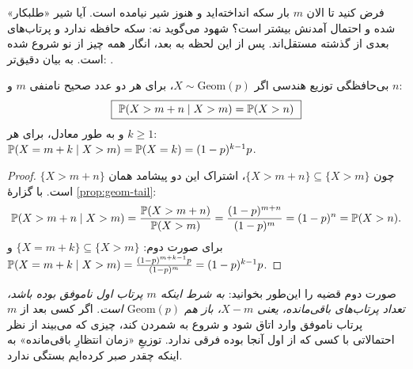 فرض کنید تا الان $m$ بار سکه انداخته‌اید و هنوز شیر نیامده است. آیا شیر «طلبکار» شده و احتمال آمدنش بیشتر است؟ شهود می‌گوید نه: سکه حافظه ندارد و پرتاب‌های بعدی از گذشته مستقل‌اند. پس از این لحظه به بعد، انگار همه چیز از نو شروع شده است. به بیان دقیق‌تر: .

\begin{theorem}[label=thm:memoryless]{بی‌حافظگی توزیع هندسی}
اگر $X\sim\mathrm{Geom}(p)$، برای هر دو عدد صحیح نامنفی $m$ و $n$:
\[ \boxed{\ \P(X>m+n\mid X>m)=\P(X>n)\ } \]
و به طور معادل، برای هر $k\ge1$: \ $\P(X=m+k\mid X>m)=\P(X=k)=(1-p)^{k-1}p$.
\end{theorem}

\begin{proof}
چون $\{X>m+n\}\subseteq\{X>m\}$، اشتراک این دو پیشامد همان $\{X>m+n\}$ است. با گزارهٔ \ref{prop:geom-tail}:
\[ \P(X>m+n\mid X>m)=\frac{\P(X>m+n)}{\P(X>m)}=\frac{(1-p)^{m+n}}{(1-p)^m}=(1-p)^n=\P(X>n). \]
برای صورت دوم: $\{X=m+k\}\subseteq\{X>m\}$ و
$\P(X=m+k\mid X>m)=\frac{(1-p)^{m+k-1}p}{(1-p)^m}=(1-p)^{k-1}p$.
\end{proof}

\begin{intuition}
صورت دوم قضیه را این‌طور بخوانید: \emph{به شرط اینکه $m$ پرتاب اول ناموفق بوده باشد، تعداد پرتاب‌های \emph{باقی‌مانده}، یعنی $X-m$، باز هم $\mathrm{Geom}(p)$ است}. اگر کسی بعد از $m$ پرتاب ناموفق وارد اتاق شود و شروع به شمردن کند، چیزی که می‌بیند از نظر احتمالاتی با کسی که از اول آنجا بوده فرقی ندارد. توزیعِ «زمان انتظارِ باقی‌مانده» به اینکه چقدر صبر کرده‌ایم بستگی ندارد.
\end{intuition}

\begin{figblock}

\end{figblock}

